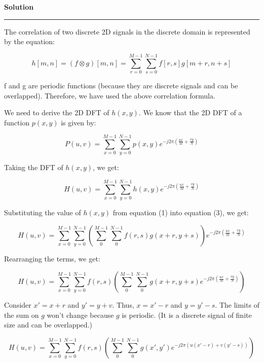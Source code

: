 \documentclass[a4paper]{article}
\newenvironment{solution}[2][]{%
    \begin{mdframed}[linecolor=green!60!black, linewidth=2pt, roundcorner=10pt, backgroundcolor=green!5!white, skipabove=12pt, skipbelow=12pt]%
        \textbf{\large #2} %
        \par\noindent\rule{\textwidth}{0.4pt} %
        \vspace{0.5em} %
}{%
    \end{mdframed}%
}
\begin{document}
\begin{solution}{Solution}
The correlation of two discrete 2D signals in the discrete domain is represented by the equation:

\begin{equation}
    h[m, n] = (f \otimes g)[m, n] = \sum_{r=0}^{M-1} \sum_{s=0}^{N-1} f[r, s]g[m+r, n+s]
\end{equation}


f and g are periodic functions (because they are discrete signals and can be overlapped). Therefore, we have used the above correlation formula.


We need to derive the 2D DFT of $h(x, y)$. We know that the 2D DFT of a function $p(x, y)$ is given by: 

\begin{equation}
    P(u, v) = \sum_{x = 0}^{M-1} \sum_{y = 0}^{N-1} p(x, y) e^{-j2\pi(\frac{ux}{M}+\frac{vy}{N})} 
\end{equation}

Taking the DFT of $h(x, y)$, we get:

\begin{equation}
    H(u, v) = \sum_{x = 0}^{M-1} \sum_{y = 0}^{N-1} h(x, y) e^{-j2\pi(\frac{ux}{M}+\frac{vy}{N})} 
\end{equation}

Substituting the value of $h(x, y)$ from equation (1) into equation (3), we get:

\begin{equation}
    H(u, v) = \sum_{x = 0}^{M-1} \sum_{y = 0}^{N-1} \left( \sum_{0}^{M-1} \sum_{0}^{N-1} f(r, s)g(x+r, y+s)\right) e^{-j2\pi(\frac{ux}{M}+\frac{vy}{N})} 
\end{equation}

Rearranging the terms, we get:

\begin{equation}
    H(u, v) = \sum_{x = 0}^{M-1} \sum_{y = 0}^{N-1} f(r, s)\left( \sum_{0}^{M-1} \sum_{0}^{N-1} g(x+r, y+s) e^{-j2\pi(\frac{ux}{M}+\frac{vy}{N})}\right)  
\end{equation}


Consider $x' = x + r$ and $y' = y + v$. Thus, $x = x' - r$ and $y = y' - s$. The limits of the sum on $g$ won't change because $g$ is periodic. (It is a discrete signal of finite size and can be overlapped.)

\begin{equation}
    H(u, v) = \sum_{x = 0}^{M-1} \sum_{y = 0}^{N-1} f(r, s)\left( \sum_{0}^{M-1} \sum_{0}^{N-1} g(x', y') e^{-j2\pi(u(x'-r)+v(y'-s))}\right)
\end{equation}


\end{solution}
\end{document}

